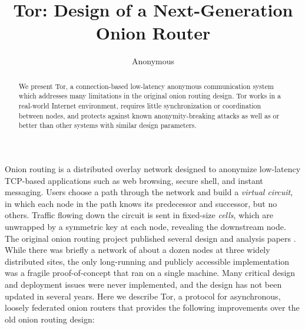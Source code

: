 \documentclass[times,10pt,twocolumn]{article}
\begin{document}

\title{Tor: Design of a Next-Generation Onion Router}

\author{Anonymous}

\maketitle
\thispagestyle{empty}

\begin{abstract}
We present Tor, a connection-based low-latency anonymous communication
system which addresses many limitations in the original onion routing design.
Tor works in a real-world Internet environment,
requires little synchronization or coordination between nodes, and
protects against known anonymity-breaking attacks as well
as or better than other systems with similar design parameters.
\end{abstract}



\label{sec:intro}

Onion routing is a distributed overlay network designed to anonymize
low-latency TCP-based applications such as web browsing, secure shell,
and instant messaging. Users choose a path through the network and
build a \emph{virtual circuit}, in which each node in the path knows its
predecessor and successor, but no others. Traffic flowing down the circuit
is sent in fixed-size \emph{cells}, which are unwrapped by a symmetric key
at each node, revealing the downstream node. The original onion routing
project published several design and analysis papers
\cite{or-jsac98,or-discex00,or-ih96,or-pet02}. While there was briefly
a network of about a dozen nodes at three widely distributed sites,
the only long-running and publicly accessible
implementation was a fragile proof-of-concept that ran on a single
machine. Many critical design and deployment issues were never implemented,
and the design has not been updated in several years.
Here we describe Tor, a protocol for asynchronous, loosely
federated onion routers that provides the following improvements over
the old onion routing design:
\end{document}
